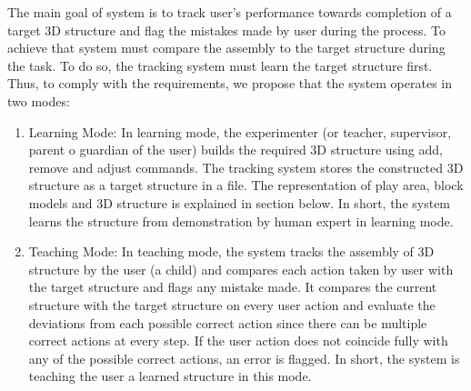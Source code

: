 The main goal of system is to track user's performance towards completion of a target 3D structure and flag the mistakes made by user during the process. To achieve that system must compare the assembly to the target structure during the task. To do so, the tracking system must learn the target structure first. Thus, to comply with the requirements, we propose that the system operates in two modes:
\begin{enumerate}
    \item Learning Mode: In learning mode, the experimenter (or teacher, supervisor, parent o guardian of the user) builds the required 3D structure using add, remove and adjust commands. The tracking system stores the constructed 3D structure as a target structure in a file. The representation of play area, block models and 3D structure is explained in section below. In short, the system learns the structure from demonstration by human expert in learning mode. 
    \item Teaching Mode: In teaching mode, the system tracks the assembly of 3D structure by the user (a child) and compares each action taken by user with the target structure and flags any mistake made. It compares the current structure with the target structure on every user action and evaluate the deviations from each possible correct action since there can be multiple correct actions at every step. If the user action does not coincide fully with any of the possible correct actions, an error is flagged. In short, the system is teaching the user a learned structure in this mode.
\end{enumerate}

